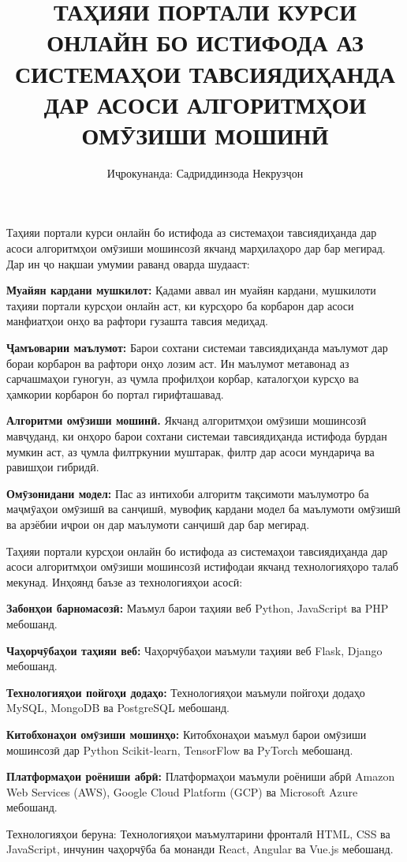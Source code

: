 \documentclass{report}
\author{Иҷрокунанда: Садриддинзода Некрузҷон }
\begin{document}
\title{ТАҲИЯИ ПОРТАЛИ КУРСИ ОНЛАЙН БО ИСТИФОДА АЗ СИСТЕМАҲОИ ТАВСИЯДИҲАНДА ДАР АСОСИ АЛГОРИТМҲОИ ОМӮЗИШИ МОШИНӢ }
\maketitle 

Таҳияи портали курси онлайн бо истифода аз системаҳои тавсиядиҳанда дар асоси алгоритмҳои омӯзиши мошинсозӣ якчанд марҳилаҳоро дар бар мегирад. Дар ин ҷо нақшаи умумии раванд оварда шудааст: 
 
 
 
           \textbf{Муайян кардани мушкилот:}  Қадами аввал ин муайян кардани, мушкилоти таҳияи портали курсҳои онлайн аст, ки курсҳоро ба корбарон дар асоси манфиатҳои онҳо ва рафтори гузашта тавсия медиҳад. 
 
           \textbf{Ҷамъоварии маълумот:} Барои сохтани системаи тавсиядиҳанда маълумот дар бораи корбарон ва рафтори онҳо лозим аст. Ин маълумот метавонад аз сарчашмаҳои гуногун, аз ҷумла профилҳои корбар, каталогҳои курсҳо ва ҳамкории корбарон бо портал гирифташавад. 
 
           \textbf{Алгоритми омӯзиши мошинӣ.} Якчанд алгоритмҳои омӯзиши мошинсозӣ мавҷуданд, ки онҳоро барои сохтани системаи тавсиядиҳанда истифода бурдан мумкин аст, аз ҷумла филтркунии муштарак, филтр дар асоси мундариҷа ва равишҳои гибридӣ. 
 
          \textbf{Омӯзонидани модел:} Пас аз интихоби алгоритм тақсимоти маълумотро ба маҷмӯаҳои омӯзишӣ ва санҷишӣ, мувофиқ кардани модел ба маълумоти омӯзишӣ ва арзёбии иҷрои он дар маълумоти санҷишӣ дар бар мегирад. 
 
         Таҳияи портали курсҳои онлайн бо истифода аз системаҳои тавсиядиҳанда дар асоси алгоритмҳои омӯзиши мошинсозӣ истифодаи якчанд технологияҳоро талаб мекунад. Инҳоянд баъзе аз технологияҳои асосӣ: 
 
       \textbf{Забонҳои барномасозӣ:} Маъмул барои таҳияи веб Python, JavaScript ва PHP мебошанд. 
 
       \textbf{Чаҳорчӯбаҳои таҳияи веб:} Чаҳорчӯбаҳои маъмули таҳияи веб Flask, Django мебошанд. 
 
       \textbf{Технологияҳои пойгоҳи додаҳо:} Технологияҳои маъмули пойгоҳи додаҳо MySQL,      MongoDB ва PostgreSQL мебошанд. 
 
       \textbf{Китобхонаҳои омӯзиши мошинҳо:} Китобхонаҳои маъмул барои омӯзиши мошинсозӣ дар Python Scikit-learn, TensorFlow ва PyTorch мебошанд. 
 
         \textbf{Платформаҳои роёниши абрӣ:} Платформаҳои маъмули роёниши абрӣ Amazon Web Services (AWS), Google Cloud Platform (GCP) ва Microsoft Azure мебошанд. 
 
         Технологияҳои беруна: Технологияҳои маъмултарини фронталӣ HTML, CSS ва JavaScript, инчунин чаҳорчӯба ба монанди React, Angular ва Vue.js мебошанд. 
         
\end{document}
